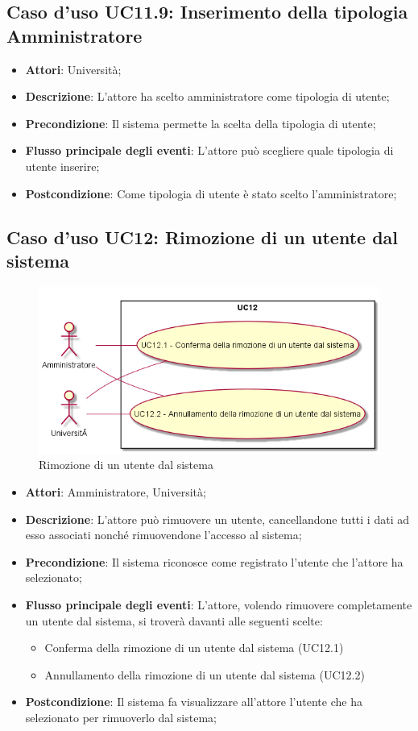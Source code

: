 \subsection{Caso d'uso \texorpdfstring{UC11.9}{UC11.9}: Inserimento della tipologia Amministratore}
\begin{itemize}
\item \textbf{Attori}: Università;
\item \textbf{Descrizione}: L'attore ha scelto amministratore come tipologia di utente; 
\item \textbf{Precondizione}: Il sistema permette la scelta della tipologia di utente;
\item \textbf{Flusso principale degli eventi}: L'attore può scegliere quale tipologia di utente inserire;
\item \textbf{Postcondizione}: Come tipologia di utente è stato scelto l'amministratore;
\end{itemize}
\subsection{Caso d'uso \texorpdfstring{UC12}{UC12}: Rimozione di un utente dal sistema}
\begin{figure} [H]
\centering
\includegraphics[scale=0.45]{./img/UC12.png}
\caption{Rimozione di un utente dal sistema}\label{}
\end{figure}
\begin{itemize}
\item \textbf{Attori}: Amministratore, Università;
\item \textbf{Descrizione}: L'attore può rimuovere un utente, cancellandone tutti i dati ad esso associati nonché rimuovendone l'accesso al sistema;
\item \textbf{Precondizione}: Il sistema riconosce come registrato l'utente che l'attore ha selezionato;
\item \textbf{Flusso principale degli eventi}: L'attore, volendo rimuovere completamente un utente dal sistema, si troverà davanti alle seguenti scelte:
\begin{itemize}
\item Conferma della rimozione di un utente dal sistema (UC12.1)
\item Annullamento della rimozione di un utente dal sistema (UC12.2)
\end{itemize}
\item \textbf{Postcondizione}: Il sistema fa visualizzare all'attore l'utente che ha selezionato per rimuoverlo dal sistema;
\end{itemize}
